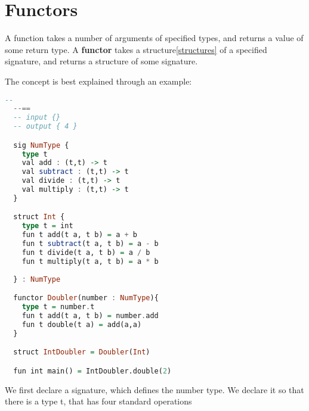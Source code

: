 \section{Functors}
\label{sec:functors}
A function takes a number of arguments of specified types, and returns a value of some return type.
A \textbf{functor} takes a structure\ref{structures} of a specified signature,
and returns a structure of some signature.

The concept is best explained through an example:
\begin{lstlisting}[language=Haskell]
  --
  --==
  -- input {}
  -- output { 4 }

  sig NumType {
    type t
    val add : (t,t) -> t
    val subtract : (t,t) -> t
    val divide : (t,t) -> t
    val multiply : (t,t) -> t
  }

  struct Int {
    type t = int
    fun t add(t a, t b) = a + b
    fun t subtract(t a, t b) = a - b
    fun t divide(t a, t b) = a / b
    fun t multiply(t a, t b) = a * b
    
  } : NumType

  functor Doubler(number : NumType){
    type t = number.t
    fun t add(t a, t b) = number.add
    fun t double(t a) = add(a,a) 
  }

  struct IntDoubler = Doubler(Int)

  fun int main() = IntDoubler.double(2)
\end{lstlisting}
We first declare a signature, which defines the number type. We declare it so
that there is a type t, that has four standard operations 







